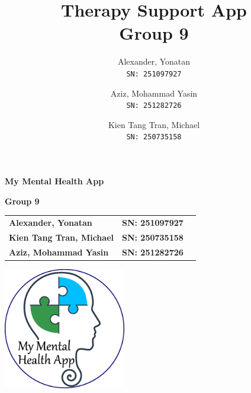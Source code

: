 \documentclass[11pt]{article}
\author{Alexander, Yonatan\\
\texttt{SN: 251097927}
\and
Aziz, Mohammad Yasin\\
\texttt{SN: 251282726}
\and
Kien Tang Tran, Michael\\
\texttt{SN: 250735158}
}
\title{Therapy Support App\\
\large Group 9}
\begin{document}
    \begin{titlepage}
        \begin{center}

            \phantom{.\\}
            \vspace{1cm}

            \begin{Huge}
                \textbf{My Mental Health App}
            \end{Huge}


            \vfill

            \begin{Large}
                \textbf{Group 9}\\
            \end{Large}

            \vspace{10pt}

            \begin{table}[h]
                \centering
                \begin{tabular}{lrr}
                    \textbf{Alexander, Yonatan}      & \textbf{SN: 251097927} \\
                    \textbf{Kien Tang Tran, Michael} & \textbf{SN: 250735158} \\
                    \textbf{Aziz, Mohammad Yasin}    & \textbf{SN: 251282726} \\
                \end{tabular}
            \end{table}



            \vfill

            \includegraphics[width=0.4\textwidth]{NewLogoEPS}   %



\end{center}
\end{titlepage}
\end{document}
